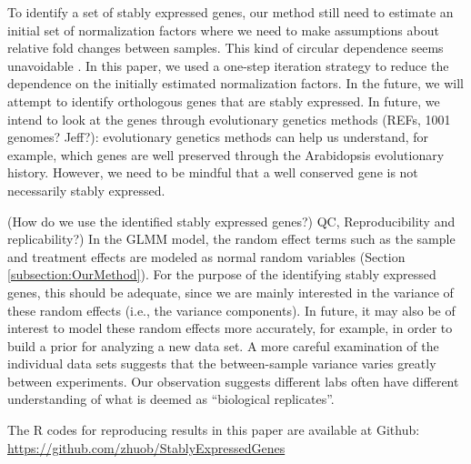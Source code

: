 \documentclass[letterpaper,12pt]{article}
\begin{document}

To identify a set of stably expressed genes, our method still need to estimate
an initial set of normalization factors where we need to make assumptions
about relative fold changes between samples. This kind of circular dependence
seems unavoidable \citep{vandesompele2002accurate}. In this paper, we used a
one-step iteration strategy to reduce the dependence on the initially
estimated normalization factors.  In the future, we will attempt to identify
orthologous genes that are stably expressed.  In future, we intend to look at
the genes through evolutionary genetics methods (REFs, 1001 genomes? Jeff?):
evolutionary genetics methods can help us understand, for example, which genes
are well preserved through the Arabidopsis evolutionary history. However, we
need to be mindful that a well conserved gene is not necessarily stably
expressed. 


(How do we use the identified stably expressed genes?) QC, Reproducibility and
replicability?)
In the GLMM model, the random effect terms such as the sample and treatment
effects are modeled as normal random variables (Section \ref{subsection:OurMethod}). For the purpose of the
identifying stably expressed genes, this should be adequate, since we are
mainly interested in the variance of these random effects (i.e., the variance
components). In future, it may also be of interest to model these random
effects more accurately, for example, in order to build a prior for analyzing
a new data set.  A more careful examination of the individual data sets
suggests that the between-sample variance varies greatly between experiments.
Our observation suggests different labs often have different understanding of
what is deemed as ``biological replicates''.


The R codes for reproducing results in this paper are available at Github:
\url{https://github.com/zhuob/StablyExpressedGenes}
\end{document}
